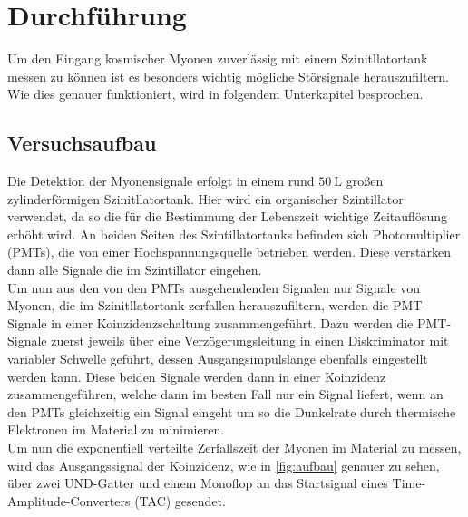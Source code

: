 \section{Durchführung}
\label{sec:Durchführung}

Um den Eingang kosmischer Myonen zuverlässig mit einem Szinitllatortank messen zu können ist es besonders wichtig mögliche Störsignale herauszufiltern. Wie dies genauer funktioniert, wird in folgendem Unterkapitel besprochen.

\subsection{Versuchsaufbau}


Die Detektion der Myonensignale erfolgt in einem rund $\qty{50}{\liter}$ großen zylinderförmigen Szinitllatortank. Hier wird ein organischer Szintillator verwendet, da so die für die Bestimmung der Lebenszeit wichtige Zeitauflösung erhöht wird. An beiden Seiten des Szintillatortanks befinden sich Photomultiplier (PMTs), die von einer Hochspannungsquelle betrieben werden. Diese verstärken dann alle Signale die im Szintillator eingehen. \\

Um nun aus den von den PMTs ausgehendenden Signalen nur Signale von Myonen, die im Szinitllatortank zerfallen herauszufiltern, werden die PMT-Signale in einer Koinzidenzschaltung zusammengeführt. 
Dazu werden die PMT-Signale zuerst jeweils über eine Verzögerungsleitung in einen Diskriminator mit variabler Schwelle geführt, dessen Ausgangsimpulslänge ebenfalls eingestellt werden kann. Diese beiden Signale werden dann in einer Koinzidenz zusammengeführen, welche dann im besten Fall nur ein Signal liefert, wenn an den PMTs gleichzeitig ein Signal eingeht um so die Dunkelrate durch thermische Elektronen im Material zu minimieren.\\

Um nun die exponentiell verteilte Zerfallszeit der Myonen im Material zu messen, wird das Ausgangssignal der Koinzidenz, wie in \autoref{fig:aufbau} genauer zu sehen, über zwei UND-Gatter und einem Monoflop an das Startsignal eines Time-Amplitude-Converters (TAC) gesendet.


